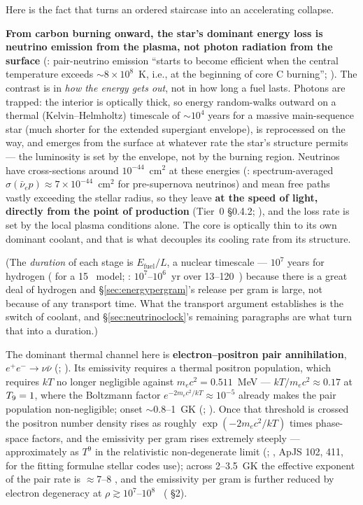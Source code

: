 Here is the fact that turns an ordered staircase into an accelerating collapse.

\textbf{From carbon burning onward, the star's dominant energy loss is neutrino
emission from the plasma, not photon radiation from the surface}
(\citealt{limongi2017}: pair-neutrino emission ``starts to become efficient when
the central temperature exceeds ${\sim}8 \times 10^8$~K, i.e., at the beginning
of core C burning''; \citealt{odrzywolek2004}). The contrast is in \emph{how the
energy gets out}, not in how long a fuel lasts. Photons are trapped: the
interior is optically thick, so energy random-walks outward on a thermal
(Kelvin--Helmholtz) timescale of ${\sim}10^4$ years for a massive main-sequence
star (much shorter for the extended supergiant envelope), is reprocessed on the
way, and emerges from the surface at whatever rate the star's structure permits
--- the luminosity is set by the envelope, not by the burning region. Neutrinos
have cross-sections around $10^{-44}$~cm$^2$ at these energies
(\citealt{odrzywolek2004}: spectrum-averaged
$\sigma(\bar\nu_e p) \approx 7 \times 10^{-44}$~cm$^2$ for pre-supernova
neutrinos) and mean free paths vastly exceeding the stellar radius, so they leave
\textbf{at the speed of light, directly from the point of production} (Tier~0
\S0.4.2; \citealt{limongi2017}), and the loss rate is set by the local plasma
conditions alone. The core is optically thin to its own dominant coolant, and
that is what decouples its cooling rate from its structure.

(The \emph{duration} of each stage is $E_{\mathrm{fuel}}/L$, a nuclear timescale
--- $10^7$ years for hydrogen (\citealt{kato2020} for a 15~\Msun{} model;
\citealt{limongi2017}: $10^7$--$10^6$~yr over 13--120~\Msun) because there is a
great deal of hydrogen and \S\ref{sec:energypergram}'s release per gram is
large, not because of any transport time. What the transport argument
establishes is the switch of coolant, and \S\ref{sec:neutrinoclock}'s remaining
paragraphs are what turn that into a duration.)

The dominant thermal channel here is \textbf{electron--positron pair
annihilation}, $e^+e^- \to \nu\bar\nu$ (\citealt{kato2020};
\citealt{patton2017}). Its emissivity requires a thermal positron population,
which requires $kT$ no longer negligible against $m_e c^2 = 0.511$~MeV ---
$kT/m_e c^2 \approx 0.17$ at $T_{9} = 1$, where the Boltzmann factor
$e^{-2m_e c^2/kT} \approx 10^{-5}$ already makes the pair population
non-negligible; onset ${\sim}$0.8--1~GK (\citealt{limongi2017};
\citealt{odrzywolek2004}). Once that threshold is crossed the positron number
density rises as roughly $\exp(-2m_e c^2/kT)$ times phase-space factors, and
the emissivity per gram rises extremely steeply --- approximately as $T^9$ in
the relativistic non-degenerate limit (\citealt{fowler1964};
\citealt{itoh1996}, ApJS 102, 411, for the fitting formulae stellar codes use);
across 2--3.5~GK the effective exponent of the pair rate is ${\approx}$7--8
, and the emissivity per gram is
further reduced by electron degeneracy at $\rho \gtrsim 10^7$--$10^8$~\gcc{}
(\citealt{kato2020} \S2).

